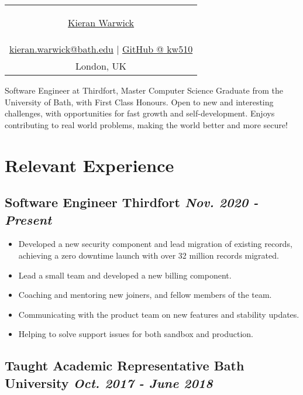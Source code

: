 \documentclass[11pt,a4paper]{report}
\begin{document}

\begin{center}
		\begin{tabular}{c}
			\begin{LARGE}
				\href{https://www.linkedin.com/in/kieran-warwick}{Kieran Warwick}
			\end{LARGE}
			\\
				\href{mailto:kieran.warwick@bath.edu}{kieran.warwick@bath.edu}
				$\vert$
				\href{https://github.com/kw510}{GitHub @ kw510}
			\\
				London, UK  
	\end{tabular}
\end{center}

\vfill

Software Engineer at Thirdfort, Master Computer Science Graduate from the University of Bath, with First Class Honours.  
Open to new and interesting challenges, with opportunities for fast growth and self-development. Enjoys contributing to 
real world problems, making the world better and more secure!

\section*{\normalfont Relevant Experience}
	\subsection*{
			Software Engineer
			\hspace{0.59in}\hfill\normalfont Thirdfort 
			\hfill\normalfont\emph{ Nov. 2020 - Present }
		}

		\begin{itemize}
			\item Developed a new security component and lead migration of existing records, achieving a zero downtime launch with over 32 million records migrated.
			\item Lead a small team and developed a new billing component.
			\item Coaching and mentoring new joiners, and fellow members of the team.
			\item Communicating with the product team on new features and stability updates.
			\item Helping to solve support issues for both sandbox and production.
		\end{itemize}

	\subsection*{
			Taught Academic Representative
			\hfill\normalfont Bath University
			\hfill\normalfont\emph{ Oct. 2017 - June 2018 }
		}
\end{document}
